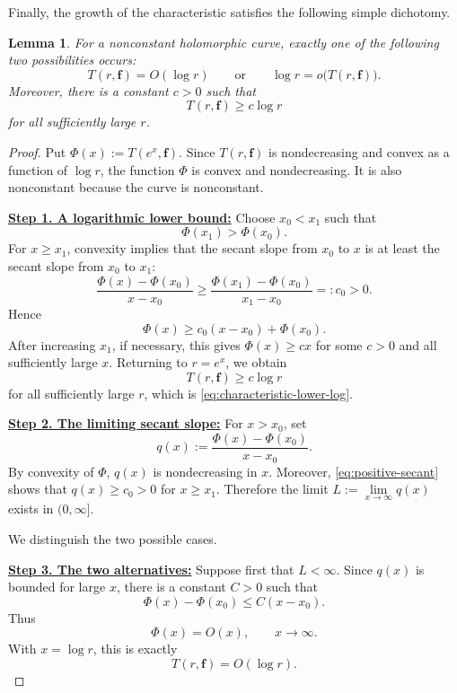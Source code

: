 \documentclass[12pt,letterpaper,reqno]{amsart}
\newtheorem{lem}[thm]{Lemma}
\theoremstyle{definition}
\numberwithin{equation}{section}
\newcommand{\fv}{\bm f}
\begin{document}
Finally, the growth of the characteristic satisfies the following simple dichotomy.

\begin{lem}\label{lem:logdichotomy}
For a nonconstant holomorphic curve, exactly one of the following two
possibilities occurs:
\begin{equation}\label{eq:logdichotomy}
 T(r,\fv)=O(\log r)
 \qquad\text{or}\qquad
 \log r=o\bigl(T(r,\fv)\bigr).
\end{equation}
Moreover, there is a constant \(c>0\) such that
\begin{equation}\label{eq:characteristic-lower-log}
 T(r,\fv)\geq c\log r
\end{equation}
for all sufficiently large \(r\).
\end{lem}

\begin{proof}

Put $
\Phi(x):=T(e^x,\fv).$
Since \(T(r,\fv)\) is nondecreasing and convex as a function of
\(\log r\), the function \(\Phi\) is convex and nondecreasing. It is
also nonconstant because the curve is nonconstant.

\medskip\noindent
\textbf{\underline{Step 1. A logarithmic lower bound:}}
Choose \(x_0<x_1\) such that
\[
\Phi(x_1)>\Phi(x_0).
\]
For \(x\geq x_1\), convexity implies that the secant slope from \(x_0\)
to \(x\) is at least the secant slope from \(x_0\) to \(x_1\):
\begin{equation}\label{eq:positive-secant}
 \frac{\Phi(x)-\Phi(x_0)}{x-x_0}
 \geq
 \frac{\Phi(x_1)-\Phi(x_0)}{x_1-x_0}
 =:c_0>0.
\end{equation}
Hence
\[
\Phi(x)\geq c_0(x-x_0)+\Phi(x_0).
\]
After increasing \(x_1\), if necessary, this gives
$
\Phi(x)\geq c x
$
for some \(c>0\) and all sufficiently large \(x\). Returning to
\(r=e^x\), we obtain
\[
T(r,\fv)\geq c\log r
\]
for all sufficiently large \(r\), which is
\eqref{eq:characteristic-lower-log}.

\medskip\noindent
\textbf{\underline{Step 2. The limiting secant slope:}}
For \(x>x_0\), set
\[
q(x):=
\frac{\Phi(x)-\Phi(x_0)}{x-x_0}.
\]
By convexity of \(\Phi\), \(q(x)\) is nondecreasing in \(x\). Moreover,
\eqref{eq:positive-secant} shows that \(q(x)\geq c_0>0\) for
\(x\geq x_1\). Therefore the limit
$
L:=\lim\limits_{x\to\infty}q(x)
$
exists in \((0,\infty]\).

We distinguish the two possible cases.

\medskip\noindent
\textbf{\underline{Step 3. The two alternatives:}}
Suppose first that \(L<\infty\). Since \(q(x)\) is bounded for large
\(x\), there is a constant \(C>0\) such that
\[
\Phi(x)-\Phi(x_0)\leq C(x-x_0).
\]
Thus
\[
\Phi(x)=O(x),
\qquad x\to\infty.
\]
With \(x=\log r\), this is exactly
\[
T(r,\fv)=O(\log r).
\]


\end{proof}
\end{document}
